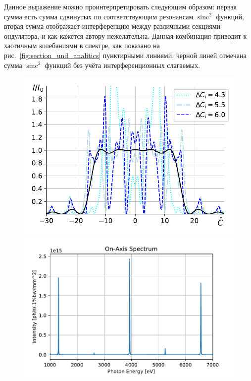\documentclass[14pt,a4paper]{extarticle}
\numberwithin{equation}{section}
\DeclareMathOperator{\sinc}{sinc}
\begin{document}
Данное выражение можно проинтерпретировать следующим образом: первая сумма есть сумма сдвинутых по соответствующим резонансам $\sinc^2$ функций, вторая сумма отображает интерференцию между различными секциями ондулятора, и как кажется автору нежелательна. Данная комбинация приводит к хаотичным колебаниями в спектре, как показано на рис.~\ref{fig:section_und_analitics} пунктирными линиями, черной линей отмечана сумма $\sinc^2$ функций без учёта интерференционных слагаемых.
\begin{figure}
	\centering  
	\begin{minipage}{0.49\textwidth}
		\centering
		\includegraphics[width=\textwidth]{pic/spec_from_sec_und.pdf}
		\caption{}
		\label{fig:section_und_analitics}
	\end{minipage}\hfill
	\begin{minipage}{0.49\textwidth}
		\centering
		\includegraphics[width=\textwidth]{pic/spec_SRW.pdf}
		\caption{}
		\label{fig:section_und_SRW}
	\end{minipage}    
\end{figure}
\end{document}
